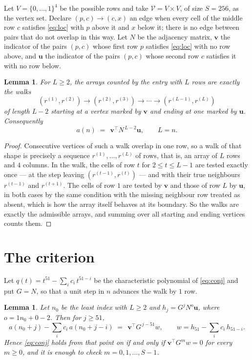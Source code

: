 \documentclass[11pt,a4paper]{article}
\theoremstyle{plain}
\newtheorem{lemma}[theorem]{Lemma}
\theoremstyle{definition}
\begin{document}
Let $V=\{0,\dots,1\}^{4}$ be the possible rows and take
$\mathcal V=V\times V$, of size $S=256$, as the vertex set. Declare $(p,c)\to(c,x)$ an edge
when every cell of the middle row $c$ satisfies \eqref{eq:loc} with $p$ above it and $x$
below it; there is no edge between pairs that do not overlap in this way. Let $N$ be the
adjacency matrix, $\mathbf{v}$ the indicator of the pairs $(p,c)$ whose first row $p$
satisfies \eqref{eq:loc} with no row above, and $\mathbf{u}$ the indicator of
the pairs $(p,c)$ whose second row $c$ satisfies it with no row below.

\begin{lemma}\label{lem:walk}
For $L\ge2$, the arrays counted by the entry with $L$ rows are exactly the walks
\[
(r^{(1)},r^{(2)})\to(r^{(2)},r^{(3)})\to\cdots\to(r^{(L-1)},r^{(L)})
\]
of length $L-2$ starting at a vertex marked by $\mathbf{v}$ and ending at one marked by
$\mathbf{u}$. Consequently
\[
a(n)\;=\;\,\mathbf{v}^{\!\top}N^{\,L-2}\mathbf{u},\qquad L=n .
\]
\end{lemma}

\begin{proof}
Consecutive vertices of such a walk overlap in one row, so a walk of that shape is
precisely a sequence $r^{(1)},\dots,r^{(L)}$ of rows, that is, an array of $L$ rows
and $4$ columns. In the walk, the cells of row $t$ for $2\le t\le L-1$ are tested
exactly once --- at the step leaving $(r^{(t-1)},r^{(t)})$ --- and with their true
neighbours $r^{(t-1)}$ and $r^{(t+1)}$. The cells of row $1$ are tested by
$\mathbf{v}$ and those of row $L$ by $\mathbf{u}$, in both cases by the same condition
with the missing neighbour row treated as absent, which is how the array itself behaves at
its boundary. So the walks are exactly the admissible arrays, and summing over all starting
and ending vertices counts them.
\end{proof}

\section{The criterion}

Let $q(t)=t^{51}-\sum_i c_i\,t^{51-i}$ be the characteristic polynomial of
\eqref{eq:conj} and put $G=N$, so that a unit step in $n$ advances the walk by
$1$ row.

\begin{lemma}\label{lem:crit}
Let $n_0$ be the least index with $L\ge2$ and $h_j=G^{j}N^{o}\mathbf{u}$, where
$o=1n_0+0-2$. Then for $j\ge51$,
\[
a(n_0+j)-\sum_i c_i\,a(n_0+j-i)\;=\;\,\mathbf{v}^{\!\top}G^{\,j-51}w,
\qquad w=h_{51}-\sum_i c_i\,h_{51-i} .
\]
Hence \eqref{eq:conj} holds from that point on if and only if
$\mathbf{v}^{\!\top}G^{m}w=0$ for every $m\ge0$, and it is enough to check
$m=0,1,\dots,S-1$.
\end{lemma}
\end{document}
